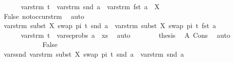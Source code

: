 \begin{isabellebody}
\ \ \ \ \ \ vars{\isacharunderscore}{\kern0pt}trm\ t\ {\isasymunion}\ vars{\isacharunderscore}{\kern0pt}trm\ {\isacharparenleft}{\kern0pt}snd\ a{\isacharparenright}{\kern0pt}\ {\isasymunion}\ vars{\isacharunderscore}{\kern0pt}trm\ {\isacharparenleft}{\kern0pt}fst\ a{\isacharparenright}{\kern0pt}\ {\isacharminus}{\kern0pt}\ {\isacharbraceleft}{\kern0pt}X{\isacharbraceright}{\kern0pt}{\isachardoublequoteclose}\isanewline
\ \ \ \ \ \ \ \ \isamarkupfalse%
\ False\ not{\isacharunderscore}{\kern0pt}occurs{\isacharunderscore}{\kern0pt}trm\ \isamarkupfalse%
\ auto\isanewline
\ \ \ \ \ \ \isamarkupfalse%
\ {\isachardoublequoteopen}vars{\isacharunderscore}{\kern0pt}trm\ {\isacharparenleft}{\kern0pt}subst\ {\isacharbrackleft}{\kern0pt}{\isacharparenleft}{\kern0pt}X{\isacharcomma}{\kern0pt}\ swap\ pi\ t{\isacharparenright}{\kern0pt}{\isacharbrackright}{\kern0pt}\ {\isacharparenleft}{\kern0pt}snd\ a{\isacharparenright}{\kern0pt}{\isacharparenright}{\kern0pt}\ {\isasymunion}\ vars{\isacharunderscore}{\kern0pt}trm\ {\isacharparenleft}{\kern0pt}subst\ {\isacharbrackleft}{\kern0pt}{\isacharparenleft}{\kern0pt}X{\isacharcomma}{\kern0pt}\ swap\ pi\ t{\isacharparenright}{\kern0pt}{\isacharbrackright}{\kern0pt}\ {\isacharparenleft}{\kern0pt}fst\ a{\isacharparenright}{\kern0pt}{\isacharparenright}{\kern0pt}\ {\isasymsubseteq}\ \isanewline
\ \ \ \ \ \ vars{\isacharunderscore}{\kern0pt}trm\ t\ {\isasymunion}\ vars{\isacharunderscore}{\kern0pt}eprobs\ {\isacharparenleft}{\kern0pt}a\ {\isacharhash}{\kern0pt}\ xs{\isacharparenright}{\kern0pt}{\isachardoublequoteclose}\ \isamarkupfalse%
\ auto\isanewline
\ \ \ \ \ \ \isamarkupfalse%
\ {\isacharquery}{\kern0pt}thesis\ \isamarkupfalse%
\ A\ Cons\ \isamarkupfalse%
\ auto\isanewline
\ \ \ \ \isamarkupfalse%
\isanewline
\ \ \ \ \ \ \isamarkupfalse%
\ False\isanewline
\ \ \ \ \ \ \isamarkupfalse%
\ vars{\isacharunderscore}{\kern0pt}snd{\isacharcolon}{\kern0pt}\ {\isachardoublequoteopen}vars{\isacharunderscore}{\kern0pt}trm\ {\isacharparenleft}{\kern0pt}subst\ {\isacharbrackleft}{\kern0pt}{\isacharparenleft}{\kern0pt}X{\isacharcomma}{\kern0pt}\ swap\ pi\ t{\isacharparenright}{\kern0pt}{\isacharbrackright}{\kern0pt}\ {\isacharparenleft}{\kern0pt}snd\ a{\isacharparenright}{\kern0pt}{\isacharparenright}{\kern0pt}\ {\isacharequal}{\kern0pt}\ vars{\isacharunderscore}{\kern0pt}trm\ {\isacharparenleft}{\kern0pt}snd\ a{\isacharparenright}{\kern0pt}{\isachardoublequoteclose}\isanewline

\end{isabellebody}
